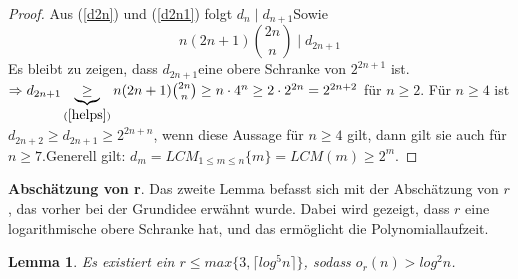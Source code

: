 \documentclass[12pt,oneside]{article}
\newtheorem{lemma}[theorem]{Lemma}
\theoremstyle{remark}
\theoremstyle{definition}
\begin{document}
\begin{proof}
\smallskip
Aus (\ref{d2n}) und (\ref{d2n1}) folgt $d_{n} \mid d_{n+1}$\newline\newline Sowie 
\begin{equation}\label{helps}
    n(2n + 1) {2n \choose n} \mid d_{2n + 1}
\end{equation}
\newline\newline
Es bleibt zu zeigen, dass $d_{2n+1} $eine obere Schranke von $2^{2n + 1}$ ist.\newline\newline  
$\Rightarrow d_{2n + 1} \underbrace{\geq}_{(\ref{helps})} n (2n + 1) {2n \choose n} \geq n \cdot 4^n \geq 2 \cdot 2^{2n} = 2^{2n + 2}$ für $n \geq 2$.\newline\newline
Für $n \geq 4$ ist $d_{2n + 2} \geq d_{2n + 1} \geq 2^{2n + n }$, wenn diese Aussage für $n \geq 4 $ gilt, dann gilt sie auch für $n \geq 7$.\newline\newline Generell gilt: $d_{m} = LCM_{1 \leq m \leq n} \{m\} = LCM(m) \geq  2^m $.
\end{proof}

\textbf{Abschätzung von r}.\newline\newline
Das zweite Lemma befasst sich mit der Abschätzung von $r$, das vorher bei der Grundidee erwähnt wurde. Dabei wird gezeigt, dass $r$ eine logarithmische obere Schranke hat, und das ermöglicht die Polynomiallaufzeit.  

\begin{lemma}
Es existiert ein $ r \leq max \{ 3, \lceil log^5 n \rceil \}$, sodass $o_{r}(n) > log^2 n$.
\end{lemma}
\end{document}
